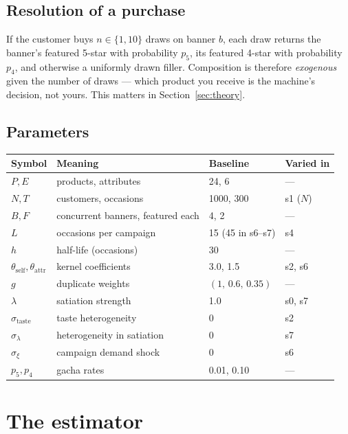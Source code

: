 \documentclass[11pt]{article}
\begin{document}
\subsection{Resolution of a purchase}

If the customer buys $n \in \{1,10\}$ draws on banner $b$, each draw returns the
banner's featured 5-star with probability $p_5$, its featured 4-star with
probability $p_4$, and otherwise a uniformly drawn filler. Composition is
therefore \emph{exogenous} given the number of draws --- which product you
receive is the machine's decision, not yours. This matters in
Section~\ref{sec:theory}.

\subsection{Parameters}

\begin{table}[h]\centering\small
\begin{tabular}{llll}
\toprule
Symbol & Meaning & Baseline & Varied in \\
\midrule
$P,E$ & products, attributes & 24, 6 & --- \\
$N,T$ & customers, occasions & 1000, 300 & s1 ($N$) \\
$B,F$ & concurrent banners, featured each & 4, 2 & --- \\
$L$ & occasions per campaign & 15 (45 in s6--s7) & s4 \\
$h$ & half-life (occasions) & 30 & --- \\
$\theta_{\text{self}},\theta_{\text{attr}}$ & kernel coefficients & 3.0, 1.5 & s2, s6 \\
$g$ & duplicate weights & $(1,\,0.6,\,0.35)$ & --- \\
$\lambda$ & satiation strength & 1.0 & s0, s7 \\
$\sigma_{\text{taste}}$ & taste heterogeneity & 0 & s2 \\
$\sigma_{\lambda}$ & heterogeneity in satiation & 0 & s7 \\
$\sigma_{\xi}$ & campaign demand shock & 0 & s6 \\
$p_5,p_4$ & gacha rates & 0.01, 0.10 & --- \\
\bottomrule
\end{tabular}
\end{table}

\section{The estimator}
\end{document}
